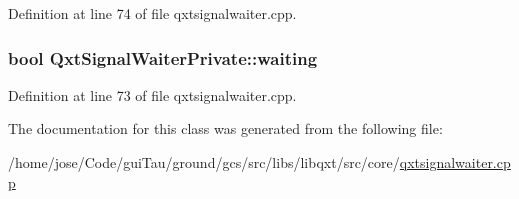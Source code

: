 Definition at line 74 of file qxtsignalwaiter.\-cpp.

\hypertarget{class_qxt_signal_waiter_private_ae3d0a9fd97a91f5a1c2ee2c9beb44bf2}{
\subsubsection[{waiting}]{\setlength{\rightskip}{0pt plus 5cm}bool Qxt\-Signal\-Waiter\-Private\-::waiting}}\label{class_qxt_signal_waiter_private_ae3d0a9fd97a91f5a1c2ee2c9beb44bf2}


Definition at line 73 of file qxtsignalwaiter.\-cpp.



The documentation for this class was generated from the following file\-:\begin{DoxyCompactItemize}
\item 
/home/jose/\-Code/gui\-Tau/ground/gcs/src/libs/libqxt/src/core/\hyperlink{qxtsignalwaiter_8cpp}{qxtsignalwaiter.\-cpp}\end{DoxyCompactItemize}
